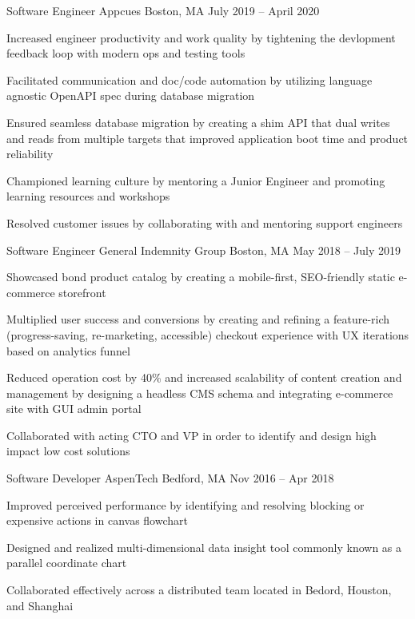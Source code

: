 \documentclass[]{awesome-cv}
\begin{document}
\begin{cventries}
	\cventry
	{Software Engineer}
	{Appcues}
	{Boston, MA}
	{July 2019 – April 2020}
	{\begin{cvitems}
		\item {Increased engineer productivity and work quality by tightening the devlopment feedback loop with modern ops and testing tools}
		\item {Facilitated communication and doc/code automation by utilizing language agnostic OpenAPI spec during database migration}
		\item {Ensured seamless database migration by creating a shim API that dual writes and reads from multiple targets that improved application boot time and product reliability}
		\item {Championed learning culture by mentoring a Junior Engineer and promoting learning resources and workshops}
		\item {Resolved customer issues by collaborating with and mentoring support engineers}
		\end{cvitems}}
	\cventry
	{Software Engineer}
	{General Indemnity Group}
	{Boston, MA}
	{May 2018 – July 2019}
	{\begin{cvitems}
		\item {Showcased bond product catalog by creating a mobile-first, SEO-friendly static e-commerce storefront}
		\item {Multiplied user success and conversions by creating and refining a feature-rich (progress-saving, re-marketing, accessible) checkout experience with UX iterations based on analytics funnel}
		\item {Reduced operation cost by 40\% and increased scalability of content creation and management by designing a headless CMS schema and integrating e-commerce site with GUI admin portal}
		\item {Collaborated with acting CTO and VP in order to identify and design high impact low cost solutions}
		\end{cvitems}}
	\cventry
	{Software Developer}
	{AspenTech}
	{Bedford, MA}
	{Nov 2016 – Apr 2018}
	{\begin{cvitems}
		\item {Improved perceived performance by identifying and resolving blocking or expensive actions in canvas flowchart}
		\item {Designed and realized multi-dimensional data insight tool commonly known as a parallel coordinate chart}
		\item {Collaborated effectively across a distributed team located in Bedord, Houston, and Shanghai}
		\end{cvitems}}
	\vspace{-5mm}
\end{cventries}
\end{document}
